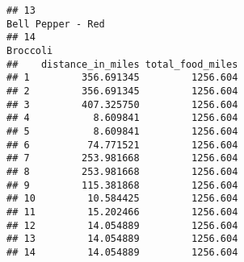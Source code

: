 \documentclass[]{article}
\begin{document}
\begin{verbatim}
## 13                                                                                                                                                                                                                                                Bell Pepper - Red
## 14                                                                                                                                                                                                                                                         Broccoli
##    distance_in_miles total_food_miles
## 1         356.691345         1256.604
## 2         356.691345         1256.604
## 3         407.325750         1256.604
## 4           8.609841         1256.604
## 5           8.609841         1256.604
## 6          74.771521         1256.604
## 7         253.981668         1256.604
## 8         253.981668         1256.604
## 9         115.381868         1256.604
## 10         10.584425         1256.604
## 11         15.202466         1256.604
## 12         14.054889         1256.604
## 13         14.054889         1256.604
## 14         14.054889         1256.604
\end{verbatim}
\end{document}
